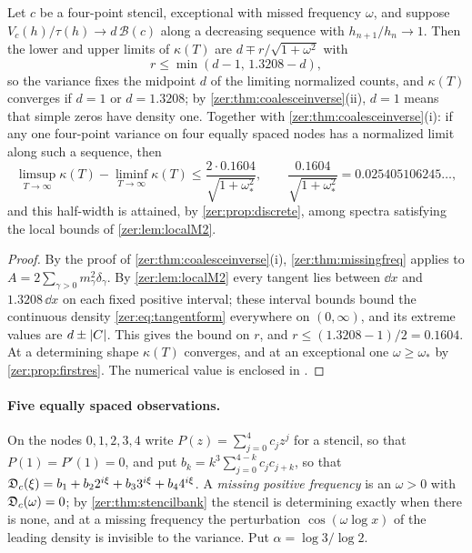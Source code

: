 \begin{corollary}\label{zer:cor:missingzeta}
Let $c$ be a four-point stencil, exceptional with missed frequency $\omega$, and suppose
$V_c(h)/\tau(h)\to d\,\mathcal B(c)$ along a decreasing sequence with $h_{n+1}/h_n\to1$. Then the lower and
upper limits of $\kappa(T)$ are $d\mp r/\sqrt{1+\omega^2}$ with
\[
 r\le\min(d-1,\,1.3208-d),
\]
so the variance fixes the midpoint $d$ of the limiting normalized counts, and $\kappa(T)$ converges if
$d=1$ or $d=1.3208$; by \cref{zer:thm:coalesceinverse}(ii), $d=1$ means that simple zeros have density
one. Together with \cref{zer:thm:coalesceinverse}(i): if any one four-point variance on four equally
spaced nodes has a normalized
limit along such a sequence, then
\[
 \limsup_{T\to\infty}\kappa(T)-\liminf_{T\to\infty}\kappa(T)\le\frac{2\cdot0.1604}{\sqrt{1+\omega_*^2}},\qquad
 \frac{0.1604}{\sqrt{1+\omega_*^2}}=0.025405106245\ldots,
\]
and this half-width is attained, by \cref{zer:prop:discrete}, among spectra satisfying the local bounds of
\cref{zer:lem:localM2}.
\end{corollary}
\begin{proof}
By the proof of \cref{zer:thm:coalesceinverse}(i), \cref{zer:thm:missingfreq} applies to
$A=2\sum_{\gamma>0}m_\gamma^2\delta_\gamma$. By \cref{zer:lem:localM2} every tangent lies between $\dd x$ and
$1.3208\,\dd x$ on each fixed positive interval; these interval bounds bound the continuous density
\eqref{zer:eq:tangentform} everywhere on $(0,\infty)$, and its extreme values are $d\pm\lvert C\rvert$. This gives the
bound on $r$, and $r\le(1.3208-1)/2=0.1604$. At a determining shape $\kappa(T)$ converges, and at an
exceptional one $\omega\ge\omega_*$ by \cref{zer:prop:firstres}. The numerical value is enclosed in
.
\end{proof}

\paragraph{Five equally spaced observations.}
On the nodes $0,1,2,3,4$ write $P(z)=\sum_{j=0}^4c_jz^j$ for a stencil, so that $P(1)=P'(1)=0$, and put
$b_k=k^3\sum_{j=0}^{4-k}c_jc_{j+k}$, so that
$\mathfrak{D}_c(\xi)=b_1+b_22^{i\xi}+b_33^{i\xi}+b_44^{i\xi}$. A \emph{missing positive frequency} is an $\omega>0$
with $\mathfrak{D}_c(\omega)=0$; by \cref{zer:thm:stencilbank} the stencil is determining exactly when there is
none, and at a missing frequency the perturbation $\cos(\omega\log x)$ of the leading density is invisible
to the variance. Put $\alpha=\log3/\log2$.

